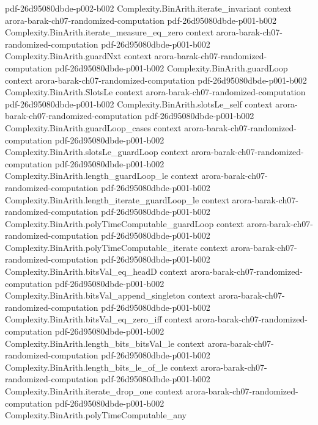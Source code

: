 \begin{theorem}
  {pdf-26d95080dbde-p002-b002}
\proofstep
  {Complexity.BinArith.iterate_invariant}
  {context}
  {arora-barak-ch07-randomized-computation}
  {pdf-26d95080dbde-p001-b002}
\proofstep
  {Complexity.BinArith.iterate_measure_eq_zero}
  {context}
  {arora-barak-ch07-randomized-computation}
  {pdf-26d95080dbde-p001-b002}
\proofstep
  {Complexity.BinArith.guardNxt}
  {context}
  {arora-barak-ch07-randomized-computation}
  {pdf-26d95080dbde-p001-b002}
\proofstep
  {Complexity.BinArith.guardLoop}
  {context}
  {arora-barak-ch07-randomized-computation}
  {pdf-26d95080dbde-p001-b002}
\proofstep
  {Complexity.BinArith.SlotsLe}
  {context}
  {arora-barak-ch07-randomized-computation}
  {pdf-26d95080dbde-p001-b002}
\proofstep
  {Complexity.BinArith.slotsLe_self}
  {context}
  {arora-barak-ch07-randomized-computation}
  {pdf-26d95080dbde-p001-b002}
\proofstep
  {Complexity.BinArith.guardLoop_cases}
  {context}
  {arora-barak-ch07-randomized-computation}
  {pdf-26d95080dbde-p001-b002}
\proofstep
  {Complexity.BinArith.slotsLe_guardLoop}
  {context}
  {arora-barak-ch07-randomized-computation}
  {pdf-26d95080dbde-p001-b002}
\proofstep
  {Complexity.BinArith.length_guardLoop_le}
  {context}
  {arora-barak-ch07-randomized-computation}
  {pdf-26d95080dbde-p001-b002}
\proofstep
  {Complexity.BinArith.length_iterate_guardLoop_le}
  {context}
  {arora-barak-ch07-randomized-computation}
  {pdf-26d95080dbde-p001-b002}
\proofstep
  {Complexity.BinArith.polyTimeComputable_guardLoop}
  {context}
  {arora-barak-ch07-randomized-computation}
  {pdf-26d95080dbde-p001-b002}
\proofstep
  {Complexity.BinArith.polyTimeComputable_iterate}
  {context}
  {arora-barak-ch07-randomized-computation}
  {pdf-26d95080dbde-p001-b002}
\proofstep
  {Complexity.BinArith.bitsVal_eq_headD}
  {context}
  {arora-barak-ch07-randomized-computation}
  {pdf-26d95080dbde-p001-b002}
\proofstep
  {Complexity.BinArith.bitsVal_append_singleton}
  {context}
  {arora-barak-ch07-randomized-computation}
  {pdf-26d95080dbde-p001-b002}
\proofstep
  {Complexity.BinArith.bitsVal_eq_zero_iff}
  {context}
  {arora-barak-ch07-randomized-computation}
  {pdf-26d95080dbde-p001-b002}
\proofstep
  {Complexity.BinArith.length_bits_bitsVal_le}
  {context}
  {arora-barak-ch07-randomized-computation}
  {pdf-26d95080dbde-p001-b002}
\proofstep
  {Complexity.BinArith.length_bits_le_of_le}
  {context}
  {arora-barak-ch07-randomized-computation}
  {pdf-26d95080dbde-p001-b002}
\proofstep
  {Complexity.BinArith.iterate_drop_one}
  {context}
  {arora-barak-ch07-randomized-computation}
  {pdf-26d95080dbde-p001-b002}
\proofstep
  {Complexity.BinArith.polyTimeComputable_any}

\end{theorem}
